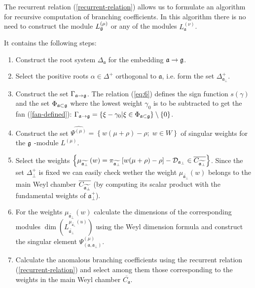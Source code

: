 \documentclass[12pt]{iopart}
\theoremstyle{definition}
\newcommand{\af}{\mathfrak{a}}
\newcommand{\afb}{\mathfrak{a}_{\bot}}
\begin{document}
\label{sec:algorithm}

The recurrent relation (\ref{recurrent-relation}) allows us to formulate an
algorithm for recursive computation of branching coefficients. In this
algorithm there is no need to construct the module $L^{(\mu)}_{\frak{g}}$ or
any of the modules $L^{(\nu)}_{\af}$.

It contains the following steps:

\begin{enumerate}
\item  Construct the root system $\Delta _{\af}$ for the embedding $%
\af\rightarrow \frak{g}$.

\item  Select the positive roots $\alpha \in \Delta ^{+}$ orthogonal
to  $\af$, i.e. form the set $\Delta _{\afb }^{+}$.

\item  Construct the set $\Gamma _{\af\rightarrow \frak{g}}$. The relation
 (\ref{eq:6}) defines the sign function
 $s(\gamma)$ and the set $\Phi_{\af\subset \frak{g}}$ where the lowest weight
 $\gamma_0$ is to be subtracted to get the fan (\ref{fan-defined}):
 $\Gamma _{\af\rightarrow \frak{g}}=\left\{ \xi -\gamma _{0}|\xi \in \Phi _{%
\af\subset \frak{g}}\right\} \setminus \left\{ 0\right\}$.

\item  Construct the set $\widehat{\Psi ^{(\mu )}}=\left\{ w (\mu +\rho
)-\rho ;\;w \in W\right\} $ of singular weights for the $\frak{g}$%
-module $L^{(\mu )}$.

\item  Select the weights $\left\{ \mu _{\widetilde{\af_{\perp }}%
}\left( w\right) =\pi _{\widetilde{\af_{\perp }}}\left[ w(\mu +\rho
)-\rho \right] -\mathcal{D}_{\af_{\perp }}\in \overline{C_{\widetilde{%
\af_{\perp }}}}\right\} $. Since the set $\Delta _{\bot }^{+}$ is fixed
we can easily check wether the weight $\mu _{\widetilde{\af_{\perp }}%
}\left( w\right) $ belongs to the main Weyl chamber $\overline{C_{\widetilde{%
\af_{\perp }}}}$ (by computing its scalar product with the fundamental
weights of $\afb^{+}$).

\item  For the weights $\mu _{\widetilde{\af_{\perp }}}\left( w\right) $
calculate the dimensions of the corresponding modules $\mathrm{\dim }\left(
L_{\widetilde{\af_{\perp }}}^{\mu _{\widetilde{\af_{\perp }}%
}\left( u\right) }\right) $ using the Weyl dimension formula and construct
the singular element $\Psi ^{\left( \mu \right) }_{\left(  \af, \afb \right)}$.

\item  Calculate the anomalous branching coefficients using the
recurrent relation (\ref{recurrent-relation}) and select among them those
corresponding to the weights in the main Weyl
chamber $\overline{C_{\af}}$.
\end{enumerate}
\end{document}
